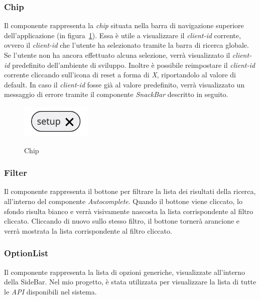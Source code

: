 \subsubsection{Chip}\label{subsubsec:chip}
Il componente rappresenta la \textit{chip} situata nella barra di navigazione superiore dell'applicazione (in figura~\ref{fig:chip}).
Essa è utile a visualizzare il \textit{client-id} corrente, ovvero il \textit{client-id} che l'utente ha selezionato tramite la barra di ricerca globale.
Se l'utente non ha ancora effettuato alcuna selezione, verrà visualizzato il \textit{client-id} predefinito dell'ambiente di sviluppo.
Inoltre è possibile reimpostare il \textit{client-id} corrente cliccando sull'icona di reset a forma di \textit{X}, riportandolo al valore di default.
In caso il \textit{client-id} fosse già al valore predefinito, verrà visualizzato un messaggio di errore tramite il componente \textit{SnackBar} descritto in seguito.

\begin{figure}[ht]
  \centering
  \includegraphics[width=0.3\textwidth, alt={Chip contenente il client id corrente}]{images/frontend/Chip.jpg}
  \caption{Chip}\label{fig:chip}
\end{figure}


\subsubsection{Filter}\label{subsubsec:filter}
Il componente rappresenta il bottone per filtrare la lista dei risultati della ricerca, all'interno del componente \textit{Autocomplete}.
Quando il bottone viene cliccato, lo sfondo risulta bianco e verrà visivamente nascosta la lista corrispondente al filtro cliccato.
Cliccando di nuovo sullo stesso filtro, il bottone tornerà arancione e verrà  mostrata la lista corrispondente al filtro cliccato.


\subsubsection{OptionList}\label{subsubsec:option-list}
Il componente rappresenta la lista di opzioni generiche, visualizzate all'interno della SideBar. Nel mio progetto, è stata utilizzata per visualizzare la lista
di tutte le \textit{API} disponibili nel sistema. 

